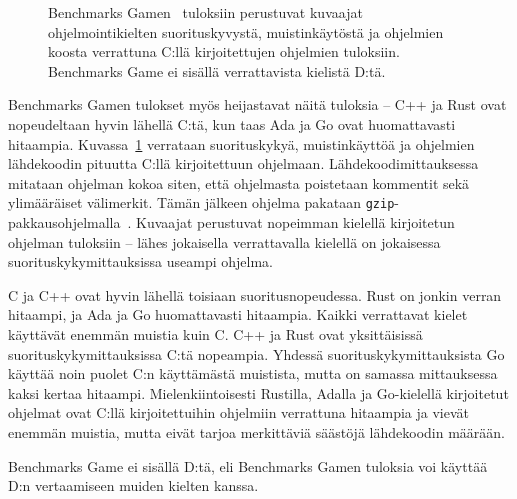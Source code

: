 \begin{figure}[ht!]
    \begin{adjustbox}{center}
    \begin{minipage}{1.15\textwidth}
    \begin{minipage}{0.5\textwidth}
        
        \vspace*{-0.8cm}
    \end{minipage}
    \begin{minipage}{0.5\textwidth}
        
        \vspace*{-0.9cm}
    \end{minipage}
    \end{minipage}
    \end{adjustbox}
    \begin{adjustbox}{center}
    \begin{minipage}{1.15\textwidth}
    \end{minipage}
    \end{adjustbox}
    \caption{
        Benchmarks Gamen~\citep[tiedot haettu 10.1.2019]{benchmarks} tuloksiin
        perustuvat kuvaajat ohjelmointikielten suorituskyvystä, muistinkäytöstä
        ja ohjelmien koosta verrattuna C:llä kirjoitettujen ohjelmien
        tuloksiin. Benchmarks Game ei sisällä verrattavista kielistä D:tä.}
    \label{fig:benchmarksgame}
\end{figure}

Benchmarks Gamen tulokset myös heijastavat näitä tuloksia -- C++ ja Rust ovat
nopeudeltaan hyvin lähellä C:tä, kun taas Ada ja Go ovat huomattavasti
hitaampia. Kuvassa~\ref{fig:benchmarksgame} verrataan suorituskykyä,
muistinkäyttöä ja ohjelmien lähdekoodin pituutta C:llä kirjoitettuun ohjelmaan.
Lähdekoodimittauksessa mitataan ohjelman kokoa siten, että ohjelmasta
poistetaan kommentit sekä ylimääräiset välimerkit. Tämän jälkeen ohjelma
pakataan \texttt{gzip}-pakkausohjelmalla~\citep{howmeasured}. Kuvaajat
perustuvat nopeimman kielellä kirjoitetun ohjelman tuloksiin -- lähes
jokaisella verrattavalla kielellä on jokaisessa suorituskykymittauksissa
useampi ohjelma.

C ja C++ ovat hyvin lähellä toisiaan suoritusnopeudessa. Rust on jonkin verran
hitaampi, ja Ada ja Go huomattavasti hitaampia. Kaikki verrattavat kielet
käyttävät enemmän muistia kuin C. C++ ja Rust ovat yksittäisissä
suorituskykymittauksissa C:tä nopeampia. Yhdessä suorituskykymittauksista Go
käyttää noin puolet C:n käyttämästä muistista, mutta on samassa mittauksessa
kaksi kertaa hitaampi. Mielenkiintoisesti Rustilla, Adalla ja Go-kielellä
kirjoitetut ohjelmat ovat C:llä kirjoitettuihin ohjelmiin verrattuna hitaampia
ja vievät enemmän muistia, mutta eivät tarjoa merkittäviä säästöjä lähdekoodin
määrään.

Benchmarks Game ei sisällä D:tä, eli Benchmarks Gamen tuloksia voi käyttää D:n
vertaamiseen muiden kielten kanssa.

\FloatBarrier

\null

\newpage
